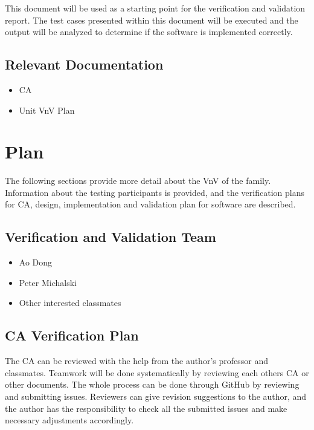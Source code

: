 \documentclass[12pt, titlepage]{article}
\begin{document}
This document will be used as a starting point for the verification and
validation report.  The test cases presented within this document will be
executed and the output will be analyzed to determine if the software is
implemented correctly.

\subsection{Relevant Documentation}

\begin{itemize}
    \item CA
    \item Unit VnV Plan
\end{itemize}


\section{Plan} \label{sec_plan}

The following sections provide more detail about the VnV of the
\progname{} family. Information about the testing participants is provided, and
the verification plans for CA, design, implementation and validation plan for
software are described.

\subsection{Verification and Validation Team}

\begin{itemize}
    \item Ao Dong
    \item Peter Michalski
    \item Other interested classmates 
\end{itemize}

\subsection{CA Verification Plan}

The CA can be reviewed with the help from the author's professor and
classmates. Teamwork will be done systematically by reviewing each others CA or
other documents. The whole process can be done through GitHub by reviewing and
submitting issues. Reviewers can give revision suggestions to the author, and
the author has the responsibility to check all the submitted issues and make
necessary adjustments accordingly.
\end{document}
